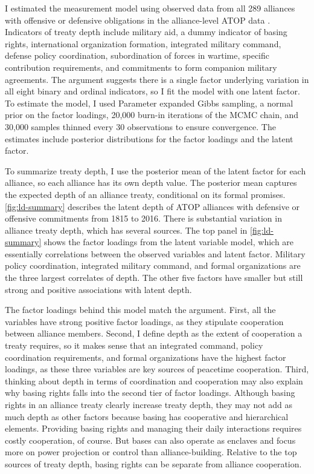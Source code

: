 \documentclass[12pt]{article}
\begin{document}
I estimated the measurement model using observed data from all 289 alliances with offensive or defensive obligations in the alliance-level ATOP data \citep{Leedsetal2002}. 
Indicators of treaty depth include military aid, a dummy indicator of basing rights, international organization formation, integrated military command, defense policy coordination, subordination of forces in wartime, specific contribution requirements, and commitments to form companion military agreements.
The argument suggests there is a single factor underlying variation in all eight binary and ordinal indicators, so I fit the model with one latent factor. 
To estimate the model, I used Parameter expanded Gibbs sampling, a normal prior on the factor loadings, 20,000 burn-in iterations of the MCMC chain, and 30,000 samples thinned every 30 observations to ensure convergence. 
The estimates include posterior distributions for the factor loadings and the latent factor. 


To summarize treaty depth, I use the posterior mean of the latent factor for each alliance, so each alliance has its own depth value.
The posterior mean captures the expected depth of an alliance treaty, conditional on its formal promises. 
\autoref{fig:ld-summary} describes the latent depth of ATOP alliances with defensive or offensive commitments from 1815 to 2016.
There is substantial variation in alliance treaty depth, which has several sources. 
The top panel in \autoref{fig:ld-summary} shows the factor loadings from the latent variable model, which are essentially correlations between the observed variables and latent factor. 
Military policy coordination, integrated military command, and formal organizations are the three largest correlates of depth. 
The other five factors have smaller but still strong and positive associations with latent depth. 


The factor loadings behind this model match the argument. 
First, all the variables have strong positive factor loadings, as they stipulate cooperation between alliance members. 
Second, I define depth as the extent of cooperation a treaty requires, so it makes sense that an integrated command, policy coordination requirements, and formal organizations have the highest factor loadings, as these three variables are key sources of peacetime cooperation. 
Third, thinking about depth in terms of coordination and cooperation may also explain why basing rights falls into the second tier of factor loadings. 
Although basing rights in an alliance treaty clearly increase treaty depth, they may not add as much depth as other factors because basing has cooperative and hierarchical elements. 
Providing basing rights and managing their daily interactions requires costly cooperation, of course. 
But bases can also operate as enclaves and focus more on power projection or control than alliance-building.  
Relative to the top sources of treaty depth, basing rights can be separate from alliance cooperation. 
\end{document}
